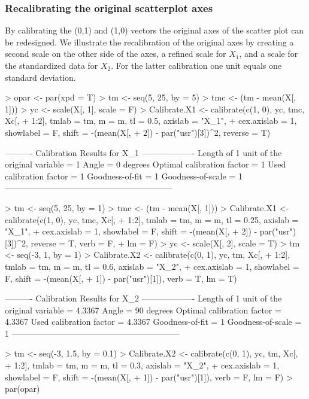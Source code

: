 \documentclass[a4paper]{article}
\begin{document}
\subsubsection*{Recalibrating the original scatterplot axes}

By calibrating the (0,1) and (1,0) vectors the original axes of the scatter plot can be 
redesigned. We illustrate the recalibration of the original axes by creating a second scale on
the other side of the axes, a refined scale for $X_1$, and a scale for the standardized data for
$X_2$. For the latter calibration one unit equals one standard deviation. 

\begin{Schunk}
\begin{Sinput}
> opar <- par(xpd = T)
> tm <- seq(5, 25, by = 5)
> tmc <- (tm - mean(X[, 1]))
> yc <- scale(X[, 1], scale = F)
> Calibrate.X1 <- calibrate(c(1, 0), yc, tmc, Xc[, 
+     1:2], tmlab = tm, m = m, tl = 0.5, axislab = "X_1", 
+     cex.axislab = 1, showlabel = F, shift = -(mean(X[, 
+         2]) - par("usr")[3])^2, reverse = T)
\end{Sinput}
\begin{Soutput}
---------- Calibration Results for  X_1  -------------------
Length of 1 unit of the original variable =  1  
Angle                                     =  0 degrees
Optimal calibration factor                =  1  
Used calibration factor                   =  1  
Goodness-of-fit                           =  1  
Goodness-of-scale                         =  1  
------------------------------------------------------------
\end{Soutput}
\begin{Sinput}
> tm <- seq(5, 25, by = 1)
> tmc <- (tm - mean(X[, 1]))
> Calibrate.X1 <- calibrate(c(1, 0), yc, tmc, Xc[, 
+     1:2], tmlab = tm, m = m, tl = 0.25, axislab = "X_1", 
+     cex.axislab = 1, showlabel = F, shift = -(mean(X[, 
+         2]) - par("usr")[3])^2, reverse = T, verb = F, 
+     lm = F)
> yc <- scale(X[, 2], scale = T)
> tm <- seq(-3, 1, by = 1)
> Calibrate.X2 <- calibrate(c(0, 1), yc, tm, Xc[, 
+     1:2], tmlab = tm, m = m, tl = 0.6, axislab = "X_2", 
+     cex.axislab = 1, showlabel = F, shift = -(mean(X[, 
+         1]) - par("usr")[1]), verb = T, lm = T)
\end{Sinput}
\begin{Soutput}
---------- Calibration Results for  X_2  -------------------
Length of 1 unit of the original variable =  4.3367  
Angle                                     =  90 degrees
Optimal calibration factor                =  4.3367  
Used calibration factor                   =  4.3367  
Goodness-of-fit                           =  1  
Goodness-of-scale                         =  1  
------------------------------------------------------------
\end{Soutput}
\begin{Sinput}
> tm <- seq(-3, 1.5, by = 0.1)
> Calibrate.X2 <- calibrate(c(0, 1), yc, tm, Xc[, 
+     1:2], tmlab = tm, m = m, tl = 0.3, axislab = "X_2", 
+     cex.axislab = 1, showlabel = F, shift = -(mean(X[, 
+         1]) - par("usr")[1]), verb = F, lm = F)
> par(opar)
\end{Sinput}
\end{Schunk}
\end{document}
